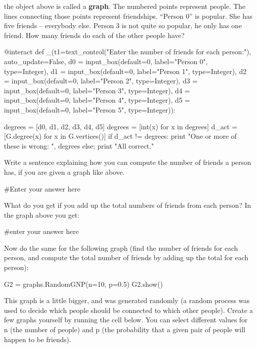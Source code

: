 the object above is called a \textbf{graph}.  The numbered points
represent people.  The lines connecting those points represent
friendships.  ``Person 0'' is popular.  She has five friends --
everybody else.  Person 3 is not quite so popular, he only has one
friend.  How many friends do each of the other people have?

\begin{sageverbatim}
@interact
def _(t1=text_control("Enter the number of friends for each person:"), auto_update=False, 
    d0 = input_box(default=0, label="Person 0", type=Integer),
    d1 = input_box(default=0, label="Person 1", type=Integer),
    d2 = input_box(default=0, label="Person 2", type=Integer),
    d3 = input_box(default=0, label="Person 3", type=Integer),
    d4 = input_box(default=0, label="Person 4", type=Integer),
    d5 = input_box(default=0, label="Person 5", type=Integer)):

    degrees = [d0, d1, d2, d3, d4, d5]
    degrees = [int(x) for x in degrees]
    d_act = [G.degree(x) for x in G.vertices()]
    if d_act != degrees:
        print "One or more of these is wrong: ", degrees
    else:
        print "All correct."
\end{sageverbatim}

Write a sentence explaining how you can compute the number of friends
a person has, if you are given a graph like above.

\begin{sageverbatim}
#Enter your answer here

\end{sageverbatim}

What do you get if you add up the total numbers of friends from each person? In
the graph above you get:

\begin{sageverbatim}
#enter your answer here

\end{sageverbatim}

Now do the same for the following graph (find the number of friends
for each person, and compute the total number of friends by adding up
the total for each person):
\begin{sageverbatim}
G2 = graphs.RandomGNP(n=10, p=0.5)
G2.show()
\end{sageverbatim}

This graph is a little bigger, and was generated randomly (a random
process was used to decide which people should be connected to which
other people).  Create a few graphs yourself by running the cell
below.  You can select different values for n (the number of people)
and p (the probability that a given pair of people will happen to be
friends).

